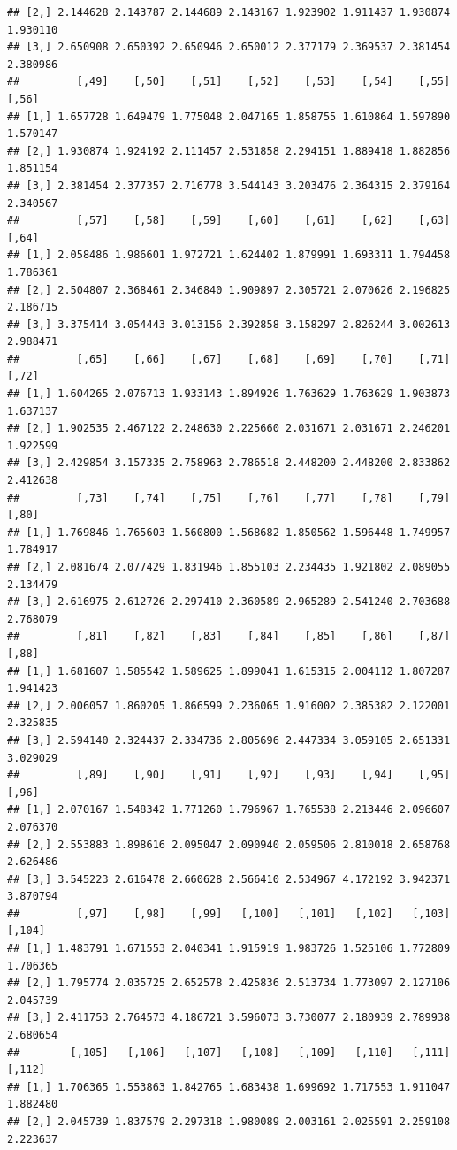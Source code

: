 \documentclass[article]{jss}\usepackage[]{graphicx}\usepackage[]{xcolor}
\makeatletter
\newenvironment{kframe}{%
 \def\at@end@of@kframe{}%
 \ifinner\ifhmode%
  \def\at@end@of@kframe{\end{minipage}}%
  \begin{minipage}{\columnwidth}%
 \fi\fi%
 \def\FrameCommand##1{\hskip\@totalleftmargin \hskip-\fboxsep
 \colorbox{shadecolor}{##1}\hskip-\fboxsep
     \hskip-\linewidth \hskip-\@totalleftmargin \hskip\columnwidth}%
 \MakeFramed {\advance\hsize-\width
   \@totalleftmargin\z@ \linewidth\hsize
   \@setminipage}}%
 {\par\unskip\endMakeFramed%
 \at@end@of@kframe}
\newenvironment{knitrout}{}{} %
\makeatother
\begin{document}
\begin{knitrout}
\begin{kframe}
\begin{verbatim}
## [2,] 2.144628 2.143787 2.144689 2.143167 1.923902 1.911437 1.930874 1.930110
## [3,] 2.650908 2.650392 2.650946 2.650012 2.377179 2.369537 2.381454 2.380986
##         [,49]    [,50]    [,51]    [,52]    [,53]    [,54]    [,55]    [,56]
## [1,] 1.657728 1.649479 1.775048 2.047165 1.858755 1.610864 1.597890 1.570147
## [2,] 1.930874 1.924192 2.111457 2.531858 2.294151 1.889418 1.882856 1.851154
## [3,] 2.381454 2.377357 2.716778 3.544143 3.203476 2.364315 2.379164 2.340567
##         [,57]    [,58]    [,59]    [,60]    [,61]    [,62]    [,63]    [,64]
## [1,] 2.058486 1.986601 1.972721 1.624402 1.879991 1.693311 1.794458 1.786361
## [2,] 2.504807 2.368461 2.346840 1.909897 2.305721 2.070626 2.196825 2.186715
## [3,] 3.375414 3.054443 3.013156 2.392858 3.158297 2.826244 3.002613 2.988471
##         [,65]    [,66]    [,67]    [,68]    [,69]    [,70]    [,71]    [,72]
## [1,] 1.604265 2.076713 1.933143 1.894926 1.763629 1.763629 1.903873 1.637137
## [2,] 1.902535 2.467122 2.248630 2.225660 2.031671 2.031671 2.246201 1.922599
## [3,] 2.429854 3.157335 2.758963 2.786518 2.448200 2.448200 2.833862 2.412638
##         [,73]    [,74]    [,75]    [,76]    [,77]    [,78]    [,79]    [,80]
## [1,] 1.769846 1.765603 1.560800 1.568682 1.850562 1.596448 1.749957 1.784917
## [2,] 2.081674 2.077429 1.831946 1.855103 2.234435 1.921802 2.089055 2.134479
## [3,] 2.616975 2.612726 2.297410 2.360589 2.965289 2.541240 2.703688 2.768079
##         [,81]    [,82]    [,83]    [,84]    [,85]    [,86]    [,87]    [,88]
## [1,] 1.681607 1.585542 1.589625 1.899041 1.615315 2.004112 1.807287 1.941423
## [2,] 2.006057 1.860205 1.866599 2.236065 1.916002 2.385382 2.122001 2.325835
## [3,] 2.594140 2.324437 2.334736 2.805696 2.447334 3.059105 2.651331 3.029029
##         [,89]    [,90]    [,91]    [,92]    [,93]    [,94]    [,95]    [,96]
## [1,] 2.070167 1.548342 1.771260 1.796967 1.765538 2.213446 2.096607 2.076370
## [2,] 2.553883 1.898616 2.095047 2.090940 2.059506 2.810018 2.658768 2.626486
## [3,] 3.545223 2.616478 2.660628 2.566410 2.534967 4.172192 3.942371 3.870794
##         [,97]    [,98]    [,99]   [,100]   [,101]   [,102]   [,103]   [,104]
## [1,] 1.483791 1.671553 2.040341 1.915919 1.983726 1.525106 1.772809 1.706365
## [2,] 1.795774 2.035725 2.652578 2.425836 2.513734 1.773097 2.127106 2.045739
## [3,] 2.411753 2.764573 4.186721 3.596073 3.730077 2.180939 2.789938 2.680654
##        [,105]   [,106]   [,107]   [,108]   [,109]   [,110]   [,111]   [,112]
## [1,] 1.706365 1.553863 1.842765 1.683438 1.699692 1.717553 1.911047 1.882480
## [2,] 2.045739 1.837579 2.297318 1.980089 2.003161 2.025591 2.259108 2.223637

\end{verbatim}
\end{kframe}
\end{knitrout}
\end{document}
